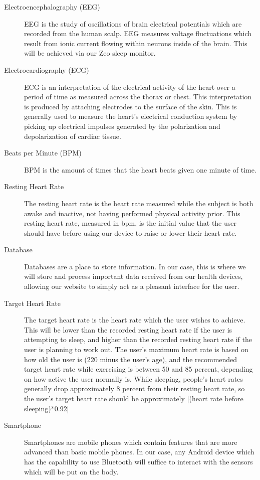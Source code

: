 \documentclass[letterpaper,english, 12pt]{scrreprt}
\begin{document}
\begin{description}
	\item[Electroencephalography (EEG)] EEG is the study of oscillations of brain electrical potentials which are recorded from the human scalp. EEG measures voltage fluctuations which result from ionic current flowing within neurons inside of the brain. This will be achieved via our Zeo sleep monitor.
	\item[Electrocardiography (ECG)] ECG is an interpretation of the electrical activity of the heart over a period of time as measured across the thorax or chest. This interpretation is produced by attaching electrodes to the surface of the skin. This is generally used to measure the heart’s electrical conduction system by picking up electrical impulses generated by the polarization and depolarization of cardiac tissue.

	\item[Beats per Minute (BPM)] BPM is the amount of times that the heart beats given one minute of time.

	\item[Resting Heart Rate] The resting heart rate is the heart rate measured while the subject is both awake and inactive, not having performed physical activity prior. This resting heart rate, measured in bpm, is the initial value that the user should have before using our device to raise or lower their heart rate.

	\item[Database] Databases are a place to store information. In our case, this is where we will store and process important data received from our health devices, allowing our website to simply act as a pleasant interface for the user.

	\item[Target Heart Rate] The target heart rate is the heart rate which the user wishes to achieve. This will be lower than the recorded resting heart rate if the user is attempting to sleep, and higher than the recorded resting heart rate if the user is planning to work out. The user's maximum heart rate is based on how old the user is (220 minus the user's age), and the recommended target heart rate while exercising is between 50 and 85 percent, depending on how active the user normally is. While sleeping, people's heart rates generally drop approximately 8 percent from their resting heart rate, so the user's target heart rate should be approximately [(heart rate before sleeping)*0.92]

	\item[Smartphone] Smartphones are mobile phones which contain features that are more advanced than basic mobile phones. In our case, any Android device which has the capability to use Bluetooth will suffice to interact with the sensors which will be put on the body.


\end{description}
\end{document}
